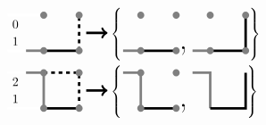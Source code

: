 \begin{align*}
  &\begin{tikzpicture}[baseline=2.5ex]
    \draw[line width=2, line cap=round, white]
     (-1,0)--(0,0)
     (-1,1)--(0,1)
    ;
    \node at (-0.8,0.5) {$\indxxx 01$};
    \draw[line width=2, gray!100] (-0.5,0)--(0,0);
%
    \draw[line width=2] (0,0)--(1,0);
    \draw[line width=2, dashed] (1,0)--(1,1);
    \fill[gray] (0,0) circle (0.1) (1,0) circle (0.1) (0,1) circle (0.1) (1,1) circle (0.1);
%
    \draw[line width=2, ->] (1.2,0.5)--(1.8,0.5);
  \end{tikzpicture} \set{
  \begin{tikzpicture}[baseline=2.5ex]
    \draw[line width=2, gray!100] (-0.5,0)--(0,0);
    \draw[line width=2] (0,0)--(1,0);
%
    \fill[gray] (0,0) circle (0.1) (1,0) circle (0.1) (0,1) circle (0.1) (1,1) circle (0.1);
    \node at (1.2,0) {\Huge ,};
  \end{tikzpicture}
  \begin{tikzpicture}[baseline=2.5ex]
    \draw[line width=2, gray!100] (-0.5,0)--(0,0);
%
    \draw[line width=2] (0,0)--(1,0);
    \draw[line width=2] (1,0)--(1,1);
    \fill[gray] (0,0) circle (0.1) (1,0) circle (0.1) (0,1) circle (0.1) (1,1) circle (0.1);
  \end{tikzpicture}
  }
  \\
  &\begin{tikzpicture}[baseline=2.5ex]  %
      \draw[line width=2, line cap=round, white]
        (-1,0)--(0,0)
        (-1,1)--(0,1)
      ;
      \node at (-0.8,0.5) {$\indxxx 21$};
      \draw[line width=2, gray!100] (-0.5,1)--(0,1)--(0,0);
%
      \draw[line width=2] (0,0)--(1,0);
      \draw[line width=2, dashed] (0,1)--(1,1)--(1,0);
      \fill[gray] (0,0) circle (0.1) (1,0) circle (0.1) (0,1) circle (0.1) (1,1) circle (0.1);
    \draw[line width=2, ->] (1.2,0.5)--(1.8,0.5);
  \end{tikzpicture} \set{
  \begin{tikzpicture}[baseline=2.5ex]
    \draw[line width=2, gray!100] (-0.5,1)--(0,1)--(0,0);
    \draw[line width=2] (0,0)--(1,0);
%
    \fill[gray] (0,0) circle (0.1) (1,0) circle (0.1) (0,1) circle (0.1) (1,1) circle (0.1);
    \node at (1.2,0) {\Huge ,};
  \end{tikzpicture}
  \begin{tikzpicture}[baseline=2.5ex]
    \draw[line width=2, gray!100] (-0.5,1)--(0,1)--(0,0);
    \draw[line width=2] (0,0)--(1,0)--(1,1);
%

\end{tikzpicture}}
\end{align*}
